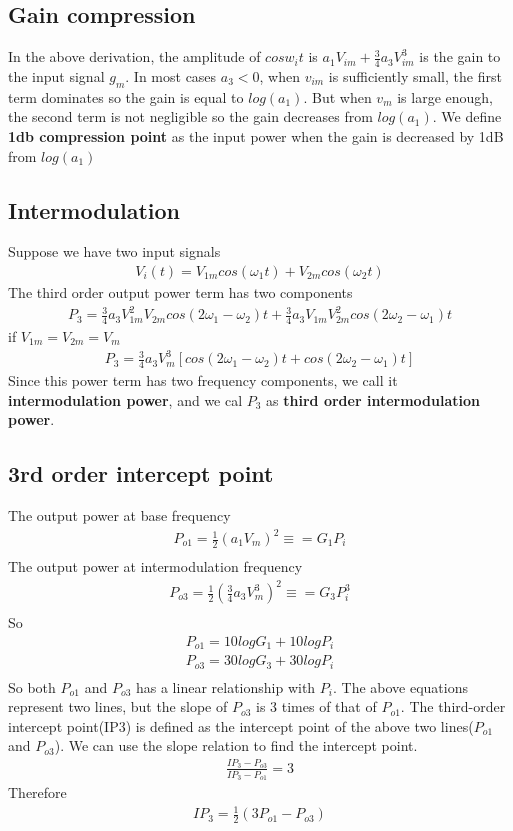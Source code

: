 \documentclass[a4paper]{article}
\begin{document}
\subsection{Gain compression}
In the above derivation, the amplitude of $cos w_i t$ is $a_1 V_{im} + \frac{3}{4} a_3 V^3_{im}$ is the gain to the input signal $g_m$. In most cases $a_3 < 0$, when $v_{im}$ is sufficiently small, the first term dominates so the gain is equal to $log(a_1)$. But when $v_m$ is large enough, the second term is not negligible so the gain decreases from $log(a_1)$. We define {\bf 1db compression point} as the input power when the gain is decreased by 1dB from $log(a_1)$
\subsection{Intermodulation}
Suppose we have two input signals
\begin{align*}
	V_i(t) = V_{1m} cos(\omega_1 t) + V_{2m} cos(\omega_2 t)
\end{align*}
The third order output power term has two components 
\begin{align*}
	P_3 = \frac{3}{4}a_3 V^2_{1m}V_{2m}cos(2\omega_1 - \omega_2)t + \frac{3}{4}a_3 V_{1m}V^2_{2m} cos(2\omega_2 - \omega_1)t
\end{align*}
if $V_{1m} = V_{2m} = V_m$
\begin{align*}
	P_3 = \frac{3}{4}a_3 V^3_{m}[cos(2\omega_1 - \omega_2)t +  cos(2\omega_2 - \omega_1)t]
\end{align*}
Since this power term has two frequency components, we call it {\bf intermodulation power}, and we cal $P_3$ as {\bf third order intermodulation power}.
\subsection{3rd order intercept point}
The output power at base frequency 
\begin{align*}
	P_{o1} = \frac{1}{2} (a_1 V_m)^2 \equiv = G_1 P_i \\ 
\end{align*}
The output power at intermodulation frequency 
\begin{align*}
	P_{o3} = \frac{1}{2} (\frac{3}{4}a_3 V^3_m)^2 \equiv = G_3 P^3_i \\
\end{align*}
So
\begin{align*}
	P_{o1} = 10 log G_1 + 10 log P_i\\
    P_{o3} = 30 log G_3	+ 30 log P_i\\
 \end{align*}
 So both $P_{o1}$ and $P_{o3}$ has a linear relationship with $P_i$. The above equations represent two lines, but the slope of $P_{o3}$ is 3 times of that of $P_{o1}$.
 The third-order intercept point(IP3) is defined as the intercept point of the above two lines($P_{o1}$ and $P_{o3}$). We can use the slope relation to find the intercept point.
 \begin{align*}
	\frac{IP_3 - P_{o3}}{IP_3 - P_{o1}} = 3
\end{align*}
Therefore
\begin{align*}
	IP_3 = \frac{1}{2} (3P_{o1} - P_{o3})
\end{align*}
\end{document}
